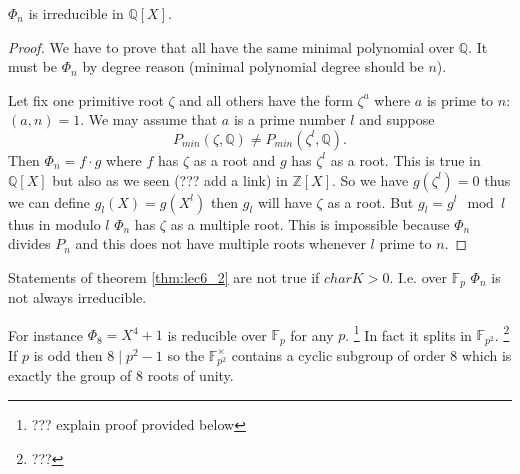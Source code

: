 \begin{theorem}
  $\Phi_n$ is irreducible in $\mathbb{Q}\left[X\right]$.
  \begin{proof}
    We have to prove that all  have
    the same minimal polynomial over $\mathbb{Q}$. It must be $\Phi_n$
    by degree reason (minimal polynomial degree should be $n$).

    Let fix one primitive root $\zeta$ and all others have the form
    $\zeta^a$ where $a$ is prime to $n$: $\left(a,n\right)=1$. We may
    assume that $a$ is a prime number $l$ and suppose
    \[
    P_{min}\left(\zeta, \mathbb{Q}\right)
    \ne
    P_{min}\left(\zeta^l, \mathbb{Q}\right).
    \]
    Then $\Phi_n = f \cdot g$ where $f$ has $\zeta$ as a root and $g$
    has $\zeta^l$ as a root. This is true in
    $\mathbb{Q}\left[X\right]$ but also as we seen (??? add a link) in
    $\mathbb{Z}\left[X\right]$. So we have $g\left(\zeta^l\right) = 0$
    thus we can define $g_l\left(X\right) = g\left(X^l\right)$ then
    $g_l$ will have $\zeta$ as a root. But $g_l = g^l \mod l$ thus in
    modulo $l$ $\Phi_n$ has $\zeta$ as a multiple root. This is
    impossible because $\Phi_n$ divides $P_n$ and this does not have
    multiple roots whenever $l$ prime to $n$. 
  \end{proof}
  \label{thm:lec6_2}
\end{theorem}

\begin{remark}
  Statements of theorem \ref{thm:lec6_2} are not true if $char K >
  0$. I.e. over $\mathbb{F}_p$ $\Phi_n$ is not always irreducible.

  For instance $\Phi_8 = X^4 + 1$ is reducible over $\mathbb{F}_p$ for
  any $p$.
  \footnote{
    ??? explain proof provided below
  }
  In fact it splits in $\mathbb{F}_{p^2}$.
  \footnote{
    ???
  }
  If $p$ is odd then $8\mid p^2-1$ so the 
  $\mathbb{F}_{p^2}^\times$ contains a cyclic subgroup of order 8 which is
  exactly the group of 8 roots of unity.
\end{remark}

